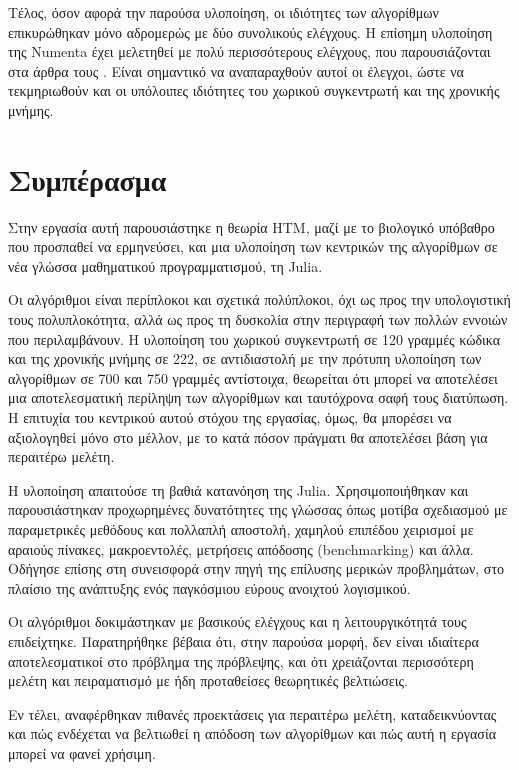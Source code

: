 	Τέλος, όσον αφορά την παρούσα υλοποίηση, οι ιδιότητες των αλγορίθμων επικυρώθηκαν μόνο αδρομερώς με δύο συνολικούς ελέγχους.
	Η επίσημη υλοποίηση της Numenta έχει μελετηθεί με πολύ περισσότερους ελέγχους, που παρουσιάζονται στα άρθρα τους
	\parencite{cuiHTMSpatialPooler2017,cuiContinuousOnlineSequence2016}.
	Είναι σημαντικό να αναπαραχθούν αυτοί οι έλεγχοι, ώστε να τεκμηριωθούν και οι υπόλοιπες ιδιότητες του χωρικού συγκεντρωτή και της χρονικής μνήμης.


\section{Συμπέρασμα}

	Στην εργασία αυτή παρουσιάστηκε η θεωρία HTM, μαζί με το βιολογικό υπόβαθρο που προσπαθεί να ερμηνεύσει,
	και μια υλοποίηση των κεντρικών της αλγορίθμων σε νέα γλώσσα μαθηματικού προγραμματισμού, τη Julia.

	Οι αλγόριθμοι είναι περίπλοκοι και σχετικά πολύπλοκοι, όχι ως προς την υπολογιστική τους πολυπλοκότητα,
	αλλά ως προς τη δυσκολία στην περιγραφή των πολλών εννοιών που περιλαμβάνουν.
	Η υλοποίηση του χωρικού συγκεντρωτή σε 120 γραμμές κώδικα και της χρονικής μνήμης σε 222,
	σε αντιδιαστολή με την πρότυπη υλοποίηση των αλγορίθμων σε 700 και 750 γραμμές αντίστοιχα,
	θεωρείται ότι μπορεί να αποτελέσει μια αποτελεσματική περίληψη των αλγορίθμων και ταυτόχρονα σαφή τους διατύπωση.
	Η επιτυχία του κεντρικού αυτού στόχου της εργασίας, όμως, θα μπορέσει να αξιολογηθεί μόνο στο μέλλον, με το κατά πόσον πράγματι θα αποτελέσει βάση για περαιτέρω μελέτη.

	Η υλοποίηση απαιτούσε τη βαθιά κατανόηση της Julia.
	Χρησιμοποιήθηκαν και παρουσιάστηκαν προχωρημένες δυνατότητες της γλώσσας όπως μοτίβα σχεδιασμού με παραμετρικές μεθόδους και πολλαπλή αποστολή,
	χαμηλού επιπέδου χειρισμοί με αραιούς πίνακες, μακροεντολές, μετρήσεις απόδοσης (benchmarking) και άλλα.
	Οδήγησε επίσης στη συνεισφορά στην πηγή της επίλυσης μερικών προβλημάτων, στο πλαίσιο της ανάπτυξης ενός παγκόσμιου εύρους ανοιχτού λογισμικού.

	Οι αλγόριθμοι δοκιμάστηκαν με βασικούς ελέγχους και η λειτουργικότητά τους επιδείχτηκε.
	Παρατηρήθηκε βέβαια ότι, στην παρούσα μορφή, δεν είναι ιδιαίτερα αποτελεσματικοί στο πρόβλημα της πρόβλεψης,
	και ότι χρειάζονται περισσότερη μελέτη και πειραματισμό με ήδη προταθείσες θεωρητικές βελτιώσεις.

	Εν τέλει, αναφέρθηκαν πιθανές προεκτάσεις για περαιτέρω μελέτη, καταδεικνύοντας και πώς ενδέχεται να βελτιωθεί η απόδοση των αλγορίθμων
	και πώς αυτή η εργασία μπορεί να φανεί χρήσιμη.
